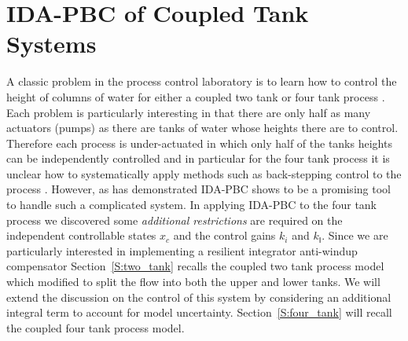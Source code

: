 \section{IDA-PBC of Coupled Tank Systems}
\label{S:tanks}%
A classic problem in the process control laboratory is to learn how to
control the height of columns of water for either a coupled two tank
\cite{astrom86:_teach_labor_for_proces_contr} or four tank process 
\cite{johansson00:_quadr_tank_proces}.  Each problem is particularly
interesting in that there are only half as many actuators (pumps) as
there are tanks of water whose heights there are to control.  Therefore
each process is under-actuated in which only half of the
tanks heights can be independently controlled and in particular for
the four tank process it is unclear how to systematically apply methods
such as back-stepping control to the process 
\cite{krstic95:_nonlin_and_adapt_contr_desig}.  However, as
\cite{johnsen07:_inter_and_dampin_assig_passiv} has demonstrated
IDA-PBC shows to be a promising tool to handle such a complicated
system.  In applying IDA-PBC to the four tank process we discovered
some {\em additional restrictions} are required on the independent
controllable states $x_c$ and the control gains $k_i$ and
$k_{\mathsf{I}}$.  Since we are particularly interested in
implementing a resilient integrator anti-windup compensator
Section~\ref{S:two_tank} recalls the coupled two tank process model which 
\cite{johnsen07:_inter_and_dampin_assig_passiv} modified to split the
flow into both the upper and lower tanks.  We will extend the
discussion on the control of this system by considering an additional
integral term to account for model uncertainty.
Section~\ref{S:four_tank} will recall the coupled four tank process model.
